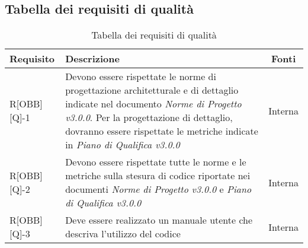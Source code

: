 \subsection{Tabella dei requisiti di qualità}

\begin{center}
	\begin{table}[h]
	\begin{tabular}{|l|p{}|c|}
		\toprule
		
		\textbf{Requisito} & \textbf{Descrizione} & \textbf{Fonti} \\
		
		\midrule
		R[OBB][Q]-1 & Devono essere rispettate le norme di progettazione architetturale e di dettaglio indicate nel documento \textit{Norme di Progetto v3.0.0}. Per la progettazione di dettaglio, dovranno essere rispettate le metriche indicate in \textit{Piano di Qualifica v3.0.0} & Interna \\ \midrule
		R[OBB][Q]-2 & Devono essere rispettate tutte le norme e le metriche sulla stesura di codice riportate nei documenti \textit{Norme di Progetto v3.0.0} e \textit{Piano di Qualifica v3.0.0} & Interna \\ \midrule
		R[OBB][Q]-3 & Deve essere realizzato un manuale utente che descriva l'utilizzo del codice & Interna \\
		
		\bottomrule

	\end{tabular}
	\caption{Tabella dei requisiti di qualità}
	
	\end{table}
\end{center}
\newpage

